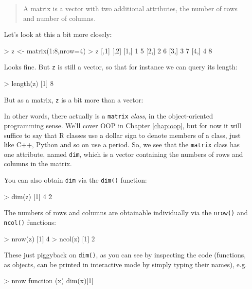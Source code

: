 \begin{quote}
A matrix is a vector with two additional attributes, the number of 
rows and number of columns.  
\end{quote}

\noindent
Let's look at this a bit more closely:

\begin{Code}
> z <- matrix(1:8,nrow=4)
> z
     [,1] [,2]
[1,]    1    5
[2,]    2    6
[3,]    3    7
[4,]    4    8
\end{Code}

\noindent
Looks fine.  But {\tt z} is still a vector, so that for instance we can
query its length:

\begin{Code}
> length(z)
[1] 8
\end{Code}

But as a matrix, {\tt z} is a bit more than a vector:


In other words, there actually is a {\tt matrix} {\it class}, in the
object-oriented programming sense.  We'll cover OOP in Chapter
\ref{chap:oop}, but for now it will suffice to say that R classes use a
dollar sign to denote members of a class, just like C++, Python and so
on use a period.  So, we see that the {\tt matrix} class has one
attribute, named {\tt dim}, which is a vector containing the numbers of
rows and columns in the matrix.

You can also obtain {\tt dim} via the {\tt dim()} function:

\begin{Code}
> dim(z)
[1] 4 2
\end{Code}

The numbers of rows and columns are obtainable individually via the
{\tt nrow()} and {\tt ncol()} functions:

\begin{Code}
> nrow(z)
[1] 4
> ncol(z)
[1] 2
\end{Code}

\noindent
These just piggyback on {\tt dim()}, as you can see by inspecting the
code (functions, as objects, can be printed in interactive mode by
simply typing their names), e.g.

\begin{Code}
> nrow
function (x) 
dim(x)[1]
\end{Code}


